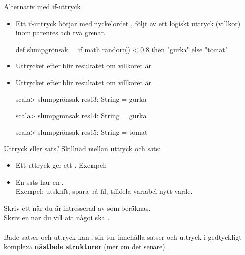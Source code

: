 \begin{Slide}{Alternativ med if-uttryck}
\begin{itemize}
\item Ett if-uttryck börjar med nyckelordet , följt av ett logiskt uttryck (villkor) inom parentes och två grenar.
\begin{Code}
def slumpgrönsak = if math.random() < 0.8 then "gurka" else "tomat"
\end{Code}
\item Uttrycket efter  blir resultatet om villkoret är 
\item Uttrycket efter  blir resultatet om villkoret är 
\begin{REPLnonum}
scala> slumpgrönsak
res13: String = gurka

scala> slumpgrönsak
res14: String = gurka

scala> slumpgrönsak
res15: String = tomat

\end{REPLnonum}
\end{itemize}
\end{Slide}


\begin{Slide}{Uttryck eller sats?}
Skillnad mellan uttryck och sats:
\begin{itemize}
\item Ett uttryck ger ett . Exempel: 
\item En sats har en . \\Exempel: utskrift, spara på fil, tilldela variabel nytt värde.
\end{itemize}
Skriv ett  när du är intresserad av  som beräknas.\\
Skriv en  när du vill att något ska .\\~\\
{\SlideFontSmall Både satser och uttryck kan i sin tur innehålla satser och uttryck i godtyckligt komplexa \textbf{nästlade strukturer} (mer om det senare).}
\end{Slide}

